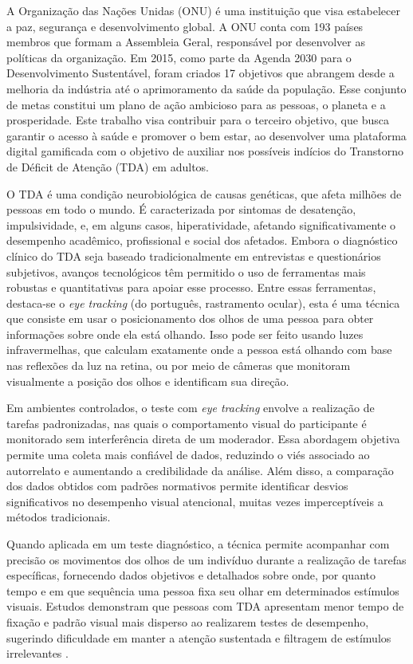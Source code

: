 A Organização das Nações Unidas (ONU) é uma instituição que visa estabelecer a paz,
segurança e desenvolvimento global. A ONU conta com 193 países membros que formam a
Assembleia Geral, responsável por desenvolver as políticas da organização. Em 2015, como
parte da Agenda 2030 para o Desenvolvimento Sustentável, foram criados 17 objetivos que
abrangem desde a melhoria da indústria até o aprimoramento da saúde da população. Esse
conjunto de metas constitui um plano de ação ambicioso para as pessoas, o planeta e a
prosperidade. Este trabalho visa contribuir para o terceiro objetivo, que busca garantir o
acesso à saúde e promover o bem estar, ao desenvolver uma plataforma digital gamificada
com o objetivo de auxiliar nos possíveis indícios do Transtorno de Déficit de Atenção (TDA)
em adultos.

O TDA é uma condição neurobiológica de causas genéticas, que afeta milhões de pessoas em todo o mundo. É caracterizada por sintomas de
desatenção, impulsividade, e, em alguns casos, hiperatividade, afetando significativamente o
desempenho acadêmico, profissional e social dos afetados. Embora o diagnóstico clínico do
TDA seja baseado tradicionalmente em entrevistas e questionários subjetivos, avanços
tecnológicos têm permitido o uso de ferramentas mais robustas e quantitativas para apoiar
esse processo. \textcite{BVS2014}
Entre essas ferramentas, destaca-se o \textit{eye tracking} (do português, rastramento ocular), esta é uma técnica
que consiste em usar o posicionamento dos olhos de uma pessoa para obter informações
sobre onde ela está olhando. Isso pode ser feito usando luzes infravermelhas, que calculam
exatamente onde a pessoa está olhando com base nas reflexões da luz na retina, ou por
meio de câmeras que monitoram visualmente a posição dos olhos e identificam sua direção.

Em ambientes controlados, o teste com \textit{eye tracking} envolve a realização de tarefas
padronizadas, nas quais o comportamento visual do participante é monitorado sem
interferência direta de um moderador. Essa abordagem objetiva permite uma coleta mais
confiável de dados, reduzindo o viés associado ao autorrelato e aumentando a credibilidade
da análise. Além disso, a comparação dos dados obtidos com padrões normativos permite
identificar desvios significativos no desempenho visual atencional, muitas vezes
imperceptíveis a métodos tradicionais.

Quando aplicada em um teste diagnóstico, a técnica permite acompanhar com
precisão os movimentos dos olhos de um indivíduo durante a realização de tarefas
específicas, fornecendo dados objetivos e detalhados sobre onde, por quanto tempo e em
que sequência uma pessoa fixa seu olhar em determinados estímulos visuais. Estudos
demonstram que pessoas com TDA apresentam menor tempo de fixação e padrão visual
mais disperso ao realizarem testes de desempenho, sugerindo dificuldade em manter a
atenção sustentada e filtragem de estímulos irrelevantes \textcite{Lim2024}.


